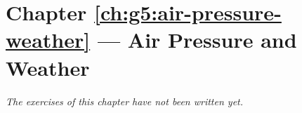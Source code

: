 \section*{Chapter \ref{ch:g5:air-pressure-weather} --- Air Pressure and Weather}


\emph{The exercises of this chapter have not been written yet.}
